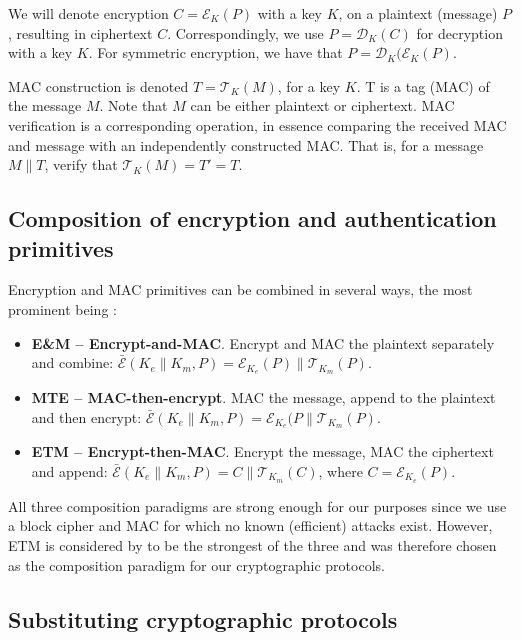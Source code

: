 We will denote encryption $C=\mathcal{E}_K(P)$ with a key $K$, on a plaintext (message) $P$, resulting in ciphertext $C$. Correspondingly, we use $P=\mathcal{D}_K(C)$ for decryption with a key $K$. For symmetric encryption, we have that $P=\mathcal{D}_K(\mathcal{E}_K(P)$.

MAC construction is denoted $T=\mathcal{T}_K(M)$, for a key $K$. T is a tag (MAC) of the message $M$. Note that $M$ can be either plaintext or ciphertext.
MAC verification is a corresponding operation, in essence comparing the received MAC and message with an independently constructed MAC. That is, for a message $M \parallel T$, verify that $\mathcal{T}_K(M) = T' = T$.

\subsection{Composition of encryption and authentication primitives}

Encryption and MAC primitives can be combined in several ways, the most prominent being :
\begin{itemize}

\item \textbf{E\&M -- Encrypt-and-MAC}. Encrypt and MAC the plaintext separately and combine: $\bar{\mathcal{E}}(K_e \parallel K_m,P) = \mathcal{E}_{K_e}(P) \parallel \mathcal{T}_{K_m}(P)$.
\item \textbf{MTE -- MAC-then-encrypt}. MAC the message, append to the plaintext and then encrypt: $\bar{\mathcal{E}}(K_e \parallel K_m,P) =\mathcal{E}_{K_e}(P \parallel \mathcal{T}_{K_m}(P)$.
\item \textbf{ETM -- Encrypt-then-MAC}. Encrypt the message, MAC the ciphertext and append: $\bar{\mathcal{E}}(K_e \parallel K_m,P) = C \parallel \mathcal{T}_{K_m}(C)$, where $C=\mathcal{E}_{K_e}(P)$.
\end{itemize}

All three composition paradigms are strong enough for our purposes since we use a block cipher and MAC for which no known (efficient) attacks exist. However, ETM is considered by \citeauthor{bellare2007} to be the strongest of the three and was therefore chosen as the composition paradigm for our cryptographic protocols.

\subsection{Substituting cryptographic protocols}

